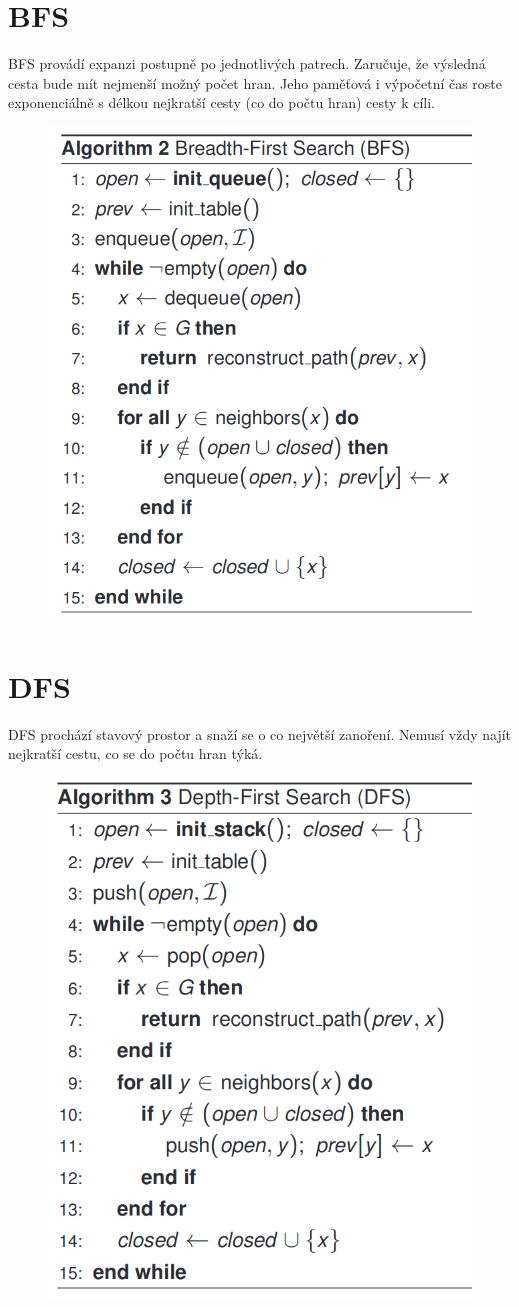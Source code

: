 \documentclass[12pt]{article}
\begin{document}
\section{BFS}
BFS provádí expanzi postupně po jednotlivých patrech. Zaručuje, že výsledná cesta bude mít nejmenší možný počet hran. Jeho paměťová i výpočetní čas roste exponenciálně s délkou nejkratší cesty (co do počtu hran) cesty k cíli.
\begin{figure}[!htb]
\includegraphics[width=0.5\linewidth]{bfs}
\end{figure}


\section{DFS}
DFS prochází stavový prostor a snaží se o co největší zanoření. Nemusí vždy najít nejkratší cestu, co se do počtu hran týká.
\begin{figure}[tb]
\includegraphics[width=0.5\linewidth]{dfs}
\end{figure}
\end{document}
